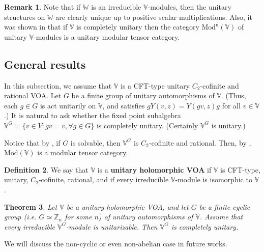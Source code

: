 \documentclass[11pt,b5paper,notitlepage]{article}
\theoremstyle{definition}
\newtheorem{df}{Definition}[section]
\newtheorem{rem}[df]{Remark}
\theoremstyle{plain}
\newtheorem{thm}[df]{Theorem}
\newcommand{\uni}{\mathrm{u}}
\newcommand{\Vbb}{\mathbb V}
\newcommand{\Wbb}{\mathbb W}
\newcommand{\Zbb}{\mathbb Z}
\newcommand{\Mod}{\mathrm{Mod}}
\numberwithin{equation}{section}
\begin{document}
\begin{rem}
Note that if $\Wbb$ is an irreducible $\Vbb$-modules, then the unitary structures on $\Wbb$ are clearly unique up to positive scalar multiplications. Also, it was shown in \cite{Gui19b} that if $\Vbb$ is completely unitary then the category $\Mod^\uni(\Vbb)$ of unitary $\Vbb$-modules is a unitary modular tensor category.
\end{rem}




\subsection{General results}



In this subsection, we assume that $\Vbb$ is a CFT-type unitary $C_2$-cofinite and rational VOA. Let $G$ be a finite group of unitary automorphisms of $\Vbb$. (Thus, each $g\in G$ is act unitarily on $\Vbb$, and satisfies $gY(v,z)=Y(gv,z)g$ for all $v\in\Vbb$.) It is natural to ask whether the fixed point subalgebra $\Vbb^G=\{v\in V:gv=v,\forall g\in G\}$ is completely unitary. (Certainly $\Vbb^G$ is unitary.) 

Notice that by \cite{Miy15,CM16}, if $G$ is solvable, then $\Vbb^G$ is $C_2$-cofinite and rational. Then, by \cite{Hua09}, $\Mod(\Vbb)$ is a modular tensor category.


\begin{df}
We say that $\Vbb$ is a \textbf{unitary holomorphic VOA} if $\Vbb$ is CFT-type, unitary, $C_2$-cofinite, rational, and if every irreducible $\Vbb$-module is isomorphic to $\Vbb$.
\end{df}

\begin{thm}\label{lb61}
Let $\Vbb$ be a unitary holomorphic VOA, and let $G$ be a finite \emph{cyclic} group (i.e. $G\simeq\Zbb_n$ for some $n$) of unitary automorphisms of $\Vbb$. Assume that every irreducible $\Vbb^G$-module is unitarizable. Then $\Vbb^G$ is completely unitary.
\end{thm}

We will discuss the non-cyclic or even non-abelian case in future works.
\end{document}
